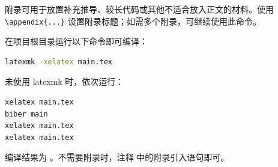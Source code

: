 \label{app:build}

附录可用于放置补充推导、较长代码或其他不适合放入正文的材料。使用 \verb|\appendix{...}| 设置附录标题；如需多个附录，可继续使用此命令。

在项目根目录运行以下命令即可编译：
\begin{lstlisting}[language=bash]
latexmk -xelatex main.tex
\end{lstlisting}

未使用 latexmk 时，依次运行：
\begin{lstlisting}[language=bash]
xelatex main.tex
biber main
xelatex main.tex
xelatex main.tex
\end{lstlisting}

编译结果为 。不需要附录时，注释  中的附录引入语句即可。
